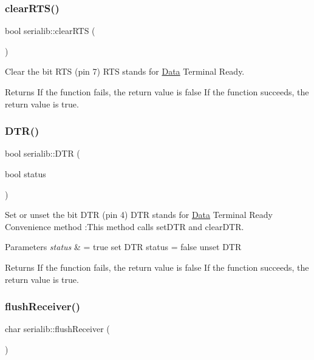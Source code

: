 \subsubsection{\texorpdfstring{clear\+R\+T\+S()}{clearRTS()}}
{\footnotesize\ttfamily bool serialib\+::clear\+R\+TS (\begin{DoxyParamCaption}{ }\end{DoxyParamCaption})}



Clear the bit R\+TS (pin 7) R\+TS stands for \hyperlink{classData}{Data} Terminal Ready. 

\begin{DoxyReturn}{Returns}
If the function fails, the return value is false If the function succeeds, the return value is true. 
\end{DoxyReturn}
\mbox{\label{classserialib_a3dc0ec56e84ab2b43dc02fc2e02148a1}} 
\subsubsection{\texorpdfstring{D\+T\+R()}{DTR()}}
{\footnotesize\ttfamily bool serialib\+::\+D\+TR (\begin{DoxyParamCaption}\item[{bool}]{status }\end{DoxyParamCaption})}



Set or unset the bit D\+TR (pin 4) D\+TR stands for \hyperlink{classData}{Data} Terminal Ready Convenience method \+:This method calls set\+D\+TR and clear\+D\+TR. 


\begin{DoxyParams}{Parameters}
{\em status} & = true set D\+TR status = false unset D\+TR \\
\hline
\end{DoxyParams}
\begin{DoxyReturn}{Returns}
If the function fails, the return value is false If the function succeeds, the return value is true. 
\end{DoxyReturn}
\mbox{\label{classserialib_a572dd8d208511ec81d848de72cb05c7a}} 
\subsubsection{\texorpdfstring{flush\+Receiver()}{flushReceiver()}}
{\footnotesize\ttfamily char serialib\+::flush\+Receiver (\begin{DoxyParamCaption}{ }\end{DoxyParamCaption})}



